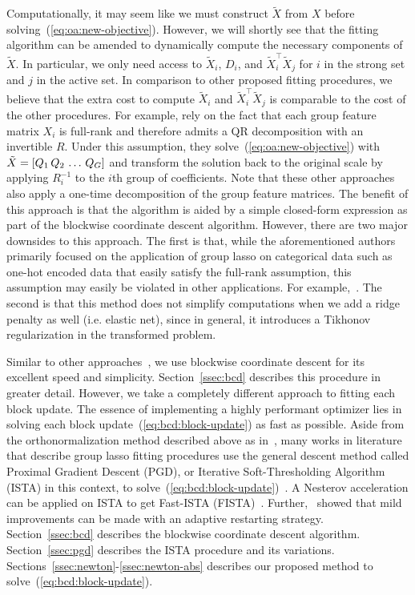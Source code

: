 Computationally, it may seem like 
we must construct $\tilde{X}$ from $X$ before solving~(\ref{eq:oa:new-objective}).
However, we will shortly see that the fitting algorithm can be amended to 
dynamically compute the necessary components of $\tilde{X}$.
In particular, we only need access to $\tilde{X}_i$, $D_i$,
and $\tilde{X}_i^\top \tilde{X}_j$ for $i$ in the strong set and $j$ in the active set.
In comparison to other proposed fitting procedures,
we believe that the extra cost to compute $\tilde{X}_i$ and $\tilde{X}_i^\top \tilde{X}_j$
is comparable to the cost of the other procedures.
For example, \citet*{yuan:2006,meier:2008} rely on the fact that
each group feature matrix $X_i$ is full-rank and therefore admits a QR decomposition with an invertible $R$.
Under this assumption, they solve~(\ref{eq:oa:new-objective}) with $\tilde{X} = \left[Q_1 \, Q_2 \, \ldots \, Q_G\right]$
and transform the solution back to the original scale by applying $R_i^{-1}$ to the $i$th group of coefficients.
Note that these other approaches also apply a one-time decomposition of the group feature matrices.
The benefit of this approach is that the algorithm is aided by a simple closed-form expression
as part of the blockwise coordinate descent algorithm.
However, there are two major downsides to this approach.
The first is that, while the aforementioned authors primarily focused on the application of group lasso 
on categorical data such as one-hot encoded data that easily satisfy the full-rank assumption,
this assumption may easily be violated in other applications.
For example,~.
The second is that this method does not simplify computations 
when we add a ridge penalty as well (i.e. elastic net), 
since in general, it introduces a Tikhonov regularization in the transformed problem.

Similar to other approaches~\citep{yuan:2006,meier:2008,tseng:2001,sparsegl:2022},
we use blockwise coordinate descent for its excellent speed and simplicity.
Section~\ref{ssec:bcd} describes this procedure in greater detail.
However, we take a completely different approach to fitting each block update.
The essence of implementing a highly performant optimizer lies in 
solving each block update~(\ref{eq:bcd:block-update}) as fast as possible.
Aside from the orthonormalization method described above as in~\citet*{yuan:2006,meier:2008},
many works in literature that describe group lasso fitting procedures
use the general descent method called Proximal Gradient Descent (PGD), 
or Iterative Soft-Thresholding Algorithm (ISTA) in this context,
to solve~(\ref{eq:bcd:block-update})~\citep{sparsegl:2022,beck:2009,klosa:2020,wright:2009,loris:2009,sls:2016,odonoghue:2015}.
A Nesterov acceleration can be applied on ISTA to get Fast-ISTA (FISTA)~\citep{beck:2009}.
Further,~\citet{odonoghue:2015} showed that mild improvements can be made with an adaptive restarting strategy.
Section~\ref{ssec:bcd} describes the blockwise coordinate descent algorithm.
Section~\ref{ssec:pgd} describes the ISTA procedure and its variations.
Sections~\ref{ssec:newton}-\ref{ssec:newton-abs} describes our proposed method to solve~(\ref{eq:bcd:block-update}).




